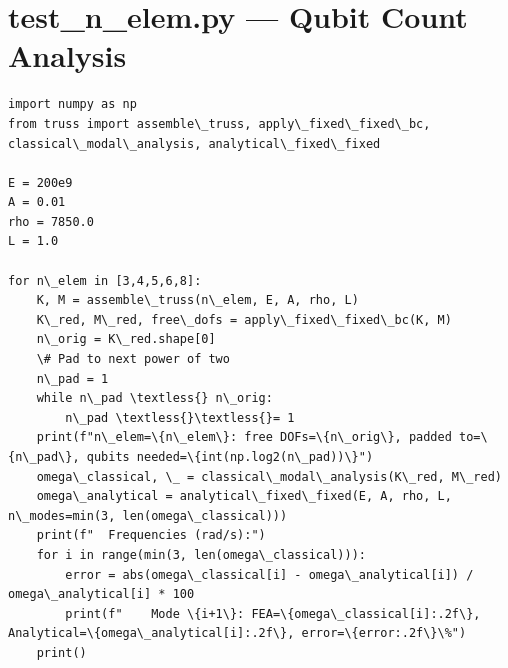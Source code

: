 \documentclass[12pt, a4paper]{article}
\begin{document}
\section{test_n_elem.py --- Qubit Count Analysis}
\begin{lstlisting}[style=codestyle, caption={{test_n_elem.py --- Qubit Count Analysis}}]
import numpy as np
from truss import assemble\_truss, apply\_fixed\_fixed\_bc, classical\_modal\_analysis, analytical\_fixed\_fixed

E = 200e9
A = 0.01
rho = 7850.0
L = 1.0

for n\_elem in [3,4,5,6,8]:
    K, M = assemble\_truss(n\_elem, E, A, rho, L)
    K\_red, M\_red, free\_dofs = apply\_fixed\_fixed\_bc(K, M)
    n\_orig = K\_red.shape[0]
    \# Pad to next power of two
    n\_pad = 1
    while n\_pad \textless{} n\_orig:
        n\_pad \textless{}\textless{}= 1
    print(f"n\_elem=\{n\_elem\}: free DOFs=\{n\_orig\}, padded to=\{n\_pad\}, qubits needed=\{int(np.log2(n\_pad))\}")
    omega\_classical, \_ = classical\_modal\_analysis(K\_red, M\_red)
    omega\_analytical = analytical\_fixed\_fixed(E, A, rho, L, n\_modes=min(3, len(omega\_classical)))
    print(f"  Frequencies (rad/s):")
    for i in range(min(3, len(omega\_classical))):
        error = abs(omega\_classical[i] - omega\_analytical[i]) / omega\_analytical[i] * 100
        print(f"    Mode \{i+1\}: FEA=\{omega\_classical[i]:.2f\}, Analytical=\{omega\_analytical[i]:.2f\}, error=\{error:.2f\}\%")
    print()
\end{lstlisting}

\end{document}
